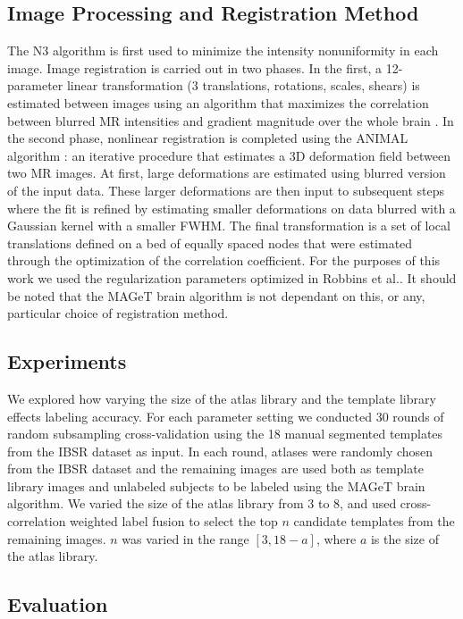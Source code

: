 \documentclass{article}\usepackage{graphicx, color}
\begin{document}
\subsection{Image Processing and Registration Method}
The N3 algorithm \cite{Sled1998} is first used to minimize the intensity
nonuniformity in each image.  Image registration is carried out in two phases.
In the first, a 12-parameter linear transformation (3 translations, rotations,
scales, shears) is estimated between images using an algorithm that maximizes
the correlation between blurred MR intensities and gradient magnitude over the
whole brain \cite{Collins}.  In the second phase, nonlinear registration is
completed using the ANIMAL algorithm \cite{Collins1995}: an iterative procedure
that estimates a 3D deformation field between two MR images. At first, large
deformations are estimated using blurred version of the input data. These
larger deformations are then input to subsequent steps where the fit is refined
by estimating smaller deformations on data blurred with a Gaussian kernel with
a smaller FWHM. The final transformation is a set of local translations defined
on a bed of equally spaced nodes that were estimated through the optimization
of the correlation coefficient. For the purposes of this work we used the
regularization parameters optimized in Robbins et al.\cite{Robbins2004}. It
should be noted that the MAGeT brain algorithm is not dependant on this, or
any, particular choice of registration method\cite{Chakravarty2011}.

\subsection{Experiments}

We explored how varying the size of the atlas library and the template library
effects labeling accuracy.  For each parameter setting we conducted 30 rounds
of random subsampling cross-validation using the 18 manual segmented templates
from the IBSR dataset as input. In each round, atlases were randomly chosen
from the IBSR dataset and the remaining images are used both as template
library images and unlabeled subjects to be labeled using the MAGeT brain
algorithm.  We varied the size of the atlas library from 3 to 8, and used
cross-correlation weighted label fusion to select the top $n$ candidate
templates from the remaining images.  $n$ was varied in the range $[3, 18-a]$,
where $a$ is the size of the atlas library.

\subsection{Evaluation}
\end{document}
